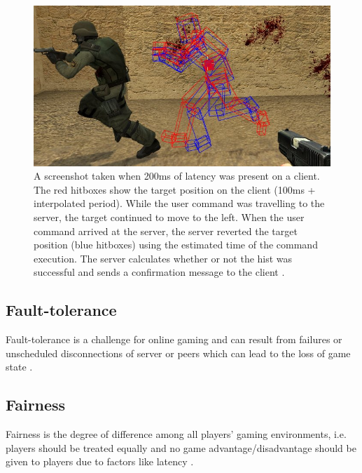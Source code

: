 
\begin{figure}
	\centering
	\includegraphics[width=\textwidth]{Figs/LagCompensation.jpg}
	\caption{ A screenshot taken when 200ms of latency was present on a client. The red hitboxes show the target position on the client (100ms + interpolated period). While the user command was travelling to the server, the target continued to move to the left. When the user command arrived at the server, the server reverted the target position (blue hitboxes) using the estimated time of the command execution. The server calculates whether or not the hist was successful and sends a confirmation message to the client \cite{Source}.}
	\label{fig_LatencyCompensation}
\end{figure}

\subsection{Fault-tolerance}
Fault-tolerance is a challenge for online gaming and can result from failures or unscheduled disconnections of server or peers which can lead to the loss of game state \cite{P2PForMMOs}.

\subsection{Fairness}
Fairness is the degree of difference among all players’ gaming environments, i.e. players should be treated equally and no game advantage/disadvantage should be given to players due to factors like latency \cite{P2PForMMOs}.

